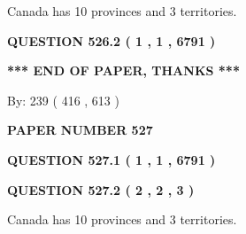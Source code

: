 \documentclass[12pt]{article}
\begin{document}
 
\noindent{}
 
 
Canada has 10  provinces and 3 territories.
 
 
 
 
  
\vspace{0.2in}
  
{\textbf{\Large{QUESTION
526.2 
 ( 1 , 1 , 6791 )
}}}
  
  
   
   
 \vspace{0.2in}
 
   
   
   
   
\vspace{1.0in} 
{\textbf{\large{ *** END OF PAPER, THANKS *** }}} 
   
   
\hspace{1.0in} By: 
 239 ( 416 ,  613 )
   
   
   
   
\newpage 
\setcounter{page}{ 
   527001 } 
   
   
   
   
 {\textbf{ \Large{ PAPER NUMBER  527  }}}
   
   
\vspace{0.2in}
   
   
   
   
   
   
 \vspace{0.2in}
 
 
 
 
   
   
  
\vspace{0.2in}
  
{\textbf{\Large{QUESTION
527.1 
 ( 1 , 1 , 6791 )
}}}
  
  
  
\vspace{0.2in}
  
{\textbf{\Large{QUESTION
527.2 
 ( 2 , 2 , 3 )
}}}
  
  
 
 
\noindent{}
 
 
Canada has 10  provinces and 3 territories.
 
\end{document}
